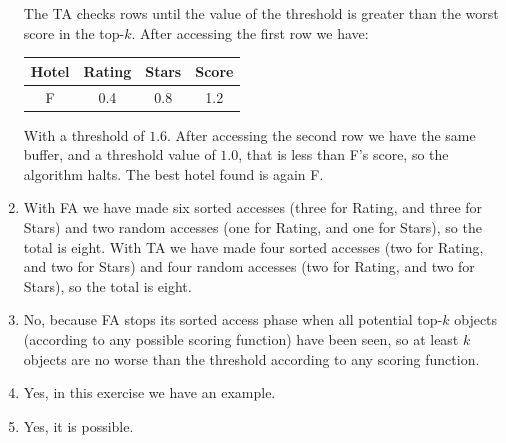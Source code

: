\documentclass[12pt, a4paper]{report}
\newtheorem[style=M,bodystyle=\normalfont]{theorem}{Theorem}
\newtheorem[style=M,bodystyle=\normalfont]{corollary}{Corollary}
\newtheorem[style=M,bodystyle=\normalfont]{lemma}{Lemma}
\newtheorem[style=M,bodystyle=\normalfont]{definition}{Definition}
\begin{document}
\begin{enumerate}
                The TA checks rows until the value of the threshold is greater than the worst score in the top-$k$. After accessing the first row 
                we have:
                \begin{table}[H]
                    \centering
                    \begin{tabular}{c|cc|c}
                    \hline
                    \textbf{Hotel} & \textbf{Rating} & \textbf{Stars} & \textbf{Score} \\ \hline
                    F     & 0.4    & 0.8   & 1.2   \\ \hline
                    \end{tabular}
                \end{table}
                With a threshold of $1.6$. After accessing the second row we have the same buffer, and a threshold value of $1.0$, that is less than F's score, so 
                the algorithm halts. The best hotel found is again F. 
            \item With FA we have made six sorted accesses (three for Rating, and three for Stars) and two random accesses (one for Rating, and one for Stars), so the total is eight. 
                With TA we have made four sorted accesses (two for Rating, and two for Stars) and four random accesses (two for Rating, and two for Stars), so the total is eight. 
            \item No, because FA stops its sorted access phase when all potential top-$k$ objects (according to any possible scoring function) have been seen, so at least $k$ objects 
                are no worse than the threshold according to any scoring function. 
            \item Yes, in this exercise we have an example. 
            \item Yes, it is possible. 
        \end{enumerate}
    
    \newpage 
\end{document}
